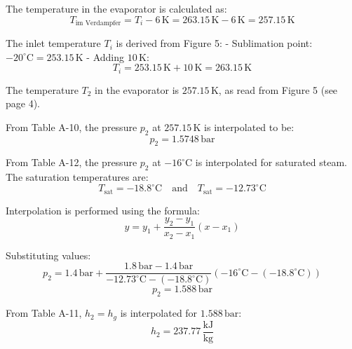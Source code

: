 The temperature in the evaporator is calculated as:  
\[
T_{\text{im Verdampfer}} = T_i - 6 \, \text{K} = 263.15 \, \text{K} - 6 \, \text{K} = 257.15 \, \text{K}
\]  

The inlet temperature \( T_i \) is derived from Figure 5:  
- Sublimation point: \( -20^\circ \text{C} = 253.15 \, \text{K} \)  
- Adding \( 10 \, \text{K} \):  
\[
T_i = 253.15 \, \text{K} + 10 \, \text{K} = 263.15 \, \text{K}
\]

The temperature \( T_2 \) in the evaporator is \( 257.15 \, \text{K} \), as read from Figure 5 (see page 4).  

From Table A-10, the pressure \( p_2 \) at \( 257.15 \, \text{K} \) is interpolated to be:  
\[
p_2 = 1.5748 \, \text{bar}
\]  

From Table A-12, the pressure \( p_2 \) at \( -16^\circ\text{C} \) is interpolated for saturated steam. The saturation temperatures are:  
\[
T_{\text{sat}} = -18.8^\circ\text{C} \quad \text{and} \quad T_{\text{sat}} = -12.73^\circ\text{C}
\]  

Interpolation is performed using the formula:  
\[
y = y_1 + \frac{y_2 - y_1}{x_2 - x_1} (x - x_1)
\]  

Substituting values:  
\[
p_2 = 1.4 \, \text{bar} + \frac{1.8 \, \text{bar} - 1.4 \, \text{bar}}{-12.73^\circ\text{C} - (-18.8^\circ\text{C})} (-16^\circ\text{C} - (-18.8^\circ\text{C}))
\]  
\[
p_2 = 1.588 \, \text{bar}
\]  

From Table A-11, \( h_2 = h_g \) is interpolated for \( 1.588 \, \text{bar} \):  
\[
h_2 = 237.77 \, \frac{\text{kJ}}{\text{kg}}
\]